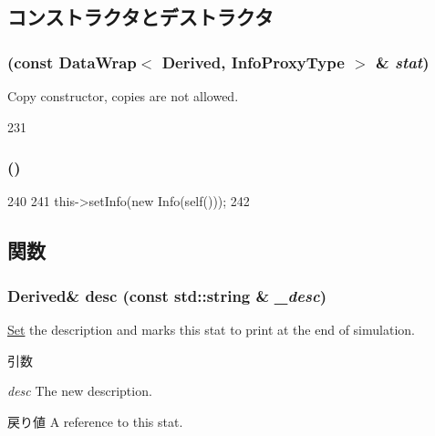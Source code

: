 \subsection{コンストラクタとデストラクタ}
\hypertarget{classStats_1_1DataWrap_a970a3b4f93d8bf65a04cc96e8de1ca66}{
\subsubsection[{DataWrap}]{ (const {\bf DataWrap}$<$ Derived, InfoProxyType $>$ \& {\em stat})}}
\label{classStats_1_1DataWrap_a970a3b4f93d8bf65a04cc96e8de1ca66}
Copy constructor, copies are not allowed. 


\begin{DoxyCode}
231 {}
\end{DoxyCode}
\hypertarget{classStats_1_1DataWrap_a05d1406c2c3dc59034270b4cca434867}{
\subsubsection[{DataWrap}]{ ()}}
\label{classStats_1_1DataWrap_a05d1406c2c3dc59034270b4cca434867}



\begin{DoxyCode}
240     {
241         this->setInfo(new Info(self()));
242     }
\end{DoxyCode}


\subsection{関数}
\hypertarget{classStats_1_1DataWrap_a468ac824164327ed474749083bbb7876}{
\subsubsection[{desc}]{\setlength{\rightskip}{0pt plus 5cm}Derived\& desc (const std::string \& {\em \_\-desc})}}
\label{classStats_1_1DataWrap_a468ac824164327ed474749083bbb7876}
\hyperlink{classSet}{Set} the description and marks this stat to print at the end of simulation. 
\begin{DoxyParams}{引数}
\item[{\em desc}]The new description. \end{DoxyParams}
\begin{DoxyReturn}{戻り値}
A reference to this stat. 
\end{DoxyReturn}




